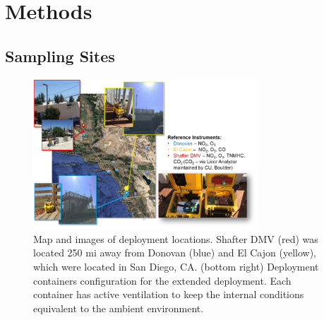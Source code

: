 \documentclass[journal abbreviation, manuscript]{copernicus}
\begin{document}

\section{Methods}

\subsection{Sampling Sites}\label{SamplingSites}

\begin{figure}
\centering
\includegraphics[width=0.75\textwidth]{writeup/img/MSdeployment.png}
\caption{Map and images of deployment locations. Shafter DMV (red) was located 250 mi away from Donovan (blue) and El Cajon (yellow), which were located in San Diego, CA. (bottom right) Deployment containers configuration for the extended deployment. Each container has active ventilation to keep the internal conditions equivalent to the ambient environment.}
\label{fig:img-map}
\end{figure}
\end{document}
